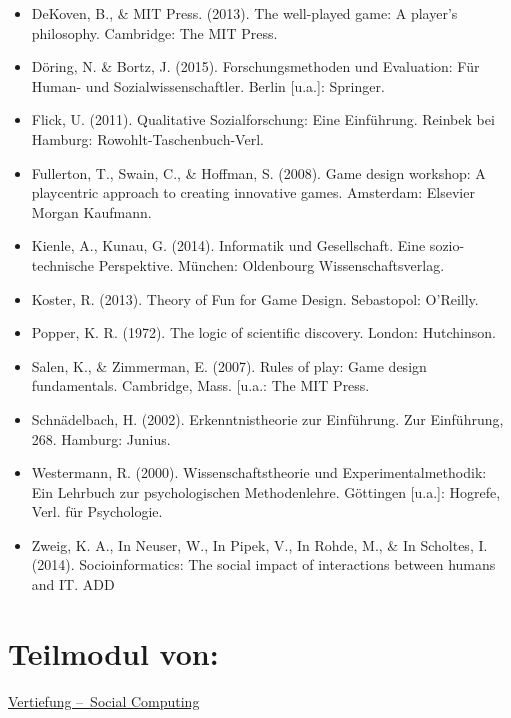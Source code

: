 \begin{itemize}
\tightlist
\item
  DeKoven, B., \& MIT Press. (2013). The well-played game: A player's
  philosophy. Cambridge: The MIT Press.
\item
  Döring, N. \& Bortz, J. (2015). Forschungsmethoden und Evaluation: Für
  Human- und Sozialwissenschaftler. Berlin {[}u.a.{]}: Springer.
\item
  Flick, U. (2011). Qualitative Sozialforschung: Eine Einführung.
  Reinbek bei Hamburg: Rowohlt-Taschenbuch-Verl.
\item
  Fullerton, T., Swain, C., \& Hoffman, S. (2008). Game design workshop:
  A playcentric approach to creating innovative games. Amsterdam:
  Elsevier Morgan Kaufmann.
\item
  Kienle, A., Kunau, G. (2014). Informatik und Gesellschaft. Eine
  sozio-technische Perspektive. München: Oldenbourg Wissenschaftsverlag.
\item
  Koster, R. (2013). Theory of Fun for Game Design. Sebastopol:
  O'Reilly.
\item
  Popper, K. R. (1972). The logic of scientific discovery. London:
  Hutchinson.
\item
  Salen, K., \& Zimmerman, E. (2007). Rules of play: Game design
  fundamentals. Cambridge, Mass. {[}u.a.: The MIT Press.
\item
  Schnädelbach, H. (2002). Erkenntnistheorie zur Einführung. Zur
  Einführung, 268. Hamburg: Junius.
\item
  Westermann, R. (2000). Wissenschaftstheorie und Experimentalmethodik:
  Ein Lehrbuch zur psychologischen Methodenlehre. Göttingen {[}u.a.{]}:
  Hogrefe, Verl. für Psychologie.
\item
  Zweig, K. A., In Neuser, W., In Pipek, V., In Rohde, M., \& In
  Scholtes, I. (2014). Socioinformatics: The social impact of
  interactions between humans and IT. ADD
\end{itemize}

\hypertarget{teilmodul-vonpathlabelmi-2017modulbeschreibungen-bachelorba_sc_gamification}{%
\section*{Teilmodul
von:\label{/mi-2017/modulbeschreibungen-bachelor/BA_SC_gamification}}\label{teilmodul-vonpathlabelmi-2017modulbeschreibungen-bachelorba_sc_gamification}}

\hyperref[/mi-2017/modulbeschreibungen-bachelor/BA_Vertiefung_SocialComputing]{Vertiefung – Social Computing}

